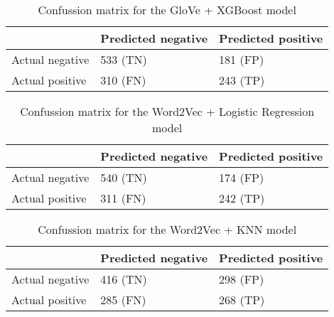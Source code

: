 \begin{table}[!htbp]
\centering
{
\makegapedcells
\begin{tabular}{lll}
                & Predicted negative & Predicted positive \\
\hline
Actual negative & 533 (TN)           & 181 (FP) \\
Actual positive & 310 (FN)           & 243 (TP) \\
\hline
\end{tabular}
}
\caption{Confussion matrix for the GloVe + XGBoost model}
\label{glovexgb_cm}
\end{table}



\begin{table}[!htbp]
\centering
{
\makegapedcells
\begin{tabular}{lll}
                & Predicted negative & Predicted positive \\
\hline
Actual negative & 540 (TN)           & 174 (FP) \\
Actual positive & 311 (FN)           & 242 (TP) \\
\hline
\end{tabular}
}
\caption{Confussion matrix for the Word2Vec + Logistic Regression model}
\label{w2vlr_cm}
\end{table}

\begin{table}[!htbp]
\centering
{
\makegapedcells
\begin{tabular}{lll}
                & Predicted negative & Predicted positive \\
\hline
Actual negative & 416 (TN)           & 298 (FP) \\
Actual positive & 285 (FN)           & 268 (TP) \\
\hline
\end{tabular}
}
\caption{Confussion matrix for the Word2Vec + KNN model}
\label{w2vknn_cm}
\end{table}

